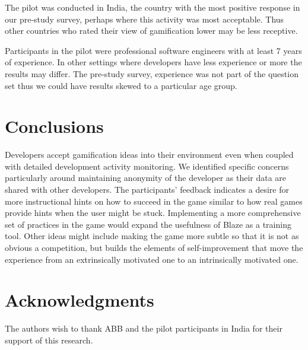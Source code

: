\documentclass{sig-alternate}
\begin{document}
 The pilot was conducted in India, the country with the most positive response in our pre-study survey, perhaps where this activity was most acceptable.  Thus other countries who rated their view of gamification lower may be less receptive. 

Participants in the pilot were professional software engineers with at least 7 years of experience.  In other settings where developers have less experience or more the results may differ.  The pre-study survey, experience was not part of the question set thus we could have results skewed to a particular age group.

\section{Conclusions}
Developers accept gamification ideas into their environment even when coupled with detailed development activity monitoring.   We identified specific concerns particularly around maintaining anonymity of the developer as their data are shared with other developers.  The participants' feedback indicates a desire for more instructional hints on how to succeed in the game similar to how real games provide hints when the user might be stuck.  Implementing a more comprehensive set of practices in the game would expand the usefulness of Blaze as a training tool.  Other ideas might include making the game more subtle so that it is not as obvious a competition, but builds the elements of self-improvement that move the experience from an extrinsically motivated one to an intrinsically motivated one.  

\section{Acknowledgments}
The authors wish to thank ABB and the pilot participants in India for their support of this research.

%

\balance
 
%
%
\end{document}
